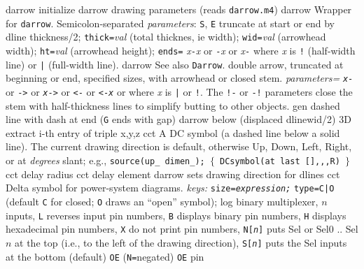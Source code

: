   {darrow}
  {initialize darrow drawing parameters (reads {\tt darrow.m4})}
  {darrow}
  {Wrapper for {\tt darrow}.
  Semicolon-separated {\sl parameters}:
    {\tt S}, {\tt E} truncate at start or end by dline thickness/2;
    {\tt thick=}{\sl val}   (total thicknes, ie width);
    {\tt wid=}{\sl val}     (arrowhead width);
    {\tt ht=}{\sl val}      (arrowhead height);
    {\tt ends=}
      {\sl x}{\tt -}{\sl x} or
      {\tt -}{\sl x} or
      {\sl x}{\tt -} where {\sl x} is {\tt !} (half-width line)
       or {\tt |} (full-width line).}
  {darrow}
  {See also {\tt Darrow}.
   double arrow, truncated at beginning or end, specified sizes,
    with arrowhead or closed stem.
    {\sl parameters=}
    {\tt {\sl x}-} or {\tt ->} or {\tt {\sl x}->} or {\tt <-} or {\tt <-{\sl x}}
    or {\tt <->} where {\sl x} is {\tt |} or {\tt !}.
    The {\tt !-} or {\tt -!} parameters close
    the stem with half-thickness lines to simplify butting to other objects. }
  {gen}
  {dashed line with dash at end ({\tt G} ends with gap)}
  {darrow}
  {below (displaced dlinewid/2)}
  {3D}
  {extract i-th entry of triple x,y,z}
  {cct}
  {A DC symbol (a dashed line below a solid line).
   The current drawing direction is default, otherwise Up, Down,
   Left, Right, or at {\sl degrees} slant; e.g., 
   {\tt source(up\_ dimen\_); $\lbrace$ DCsymbol(at last [],,,R) $\rbrace$}
    }
  {cct}
  {delay radius}
  {cct}
  {delay element}
  {darrow}
  {sets drawing direction for dlines}
  {cct}
  {Delta symbol for power-system diagrams.
   {\sl keys:} {\tt size={\sl expression;}}
    {\tt type=C|O} (default {\tt C} for closed;
      {\tt O} draws an ``open'' symbol); }
  {log}
  {binary multiplexer, $n$ inputs,
    {\tt L} reverses input pin numbers,
    {\tt B} displays binary pin numbers,
    {\tt H} displays hexadecimal pin numbers,
    {\tt X} do not print pin numbers,
    {\tt N[{\sl n}]} puts Sel or Sel$0$ .. Sel$n$ at the top
    (i.e., to the left of the drawing direction),
    {\tt S[{\sl n}]} puts the Sel inputs at the bottom (default)
    {\tt OE} ({\tt N=}negated) {\tt OE} pin
    }

